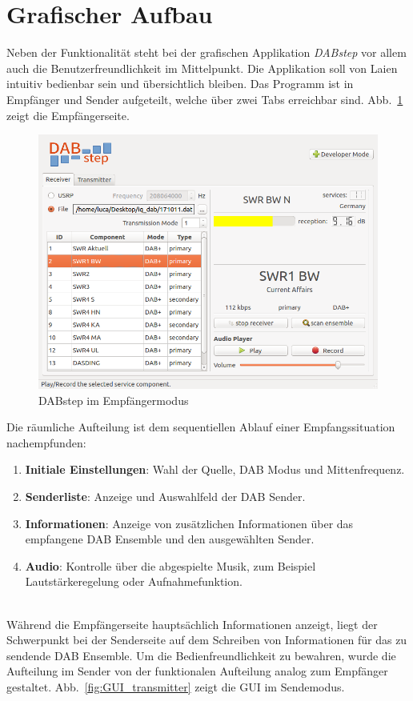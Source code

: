 \section{Grafischer Aufbau}
Neben der Funktionalität steht bei der grafischen Applikation \textit{DABstep} vor allem auch die Benutzerfreundlichkeit im Mittelpunkt. Die Applikation soll von Laien intuitiv bedienbar sein und übersichtlich bleiben. Das Programm ist in Empfänger und Sender aufgeteilt, welche über zwei Tabs erreichbar sind. Abb.~\ref{fig:GUI_receiver} zeigt die Empfängerseite.
\begin{figure}[htb]
\centering
  \includegraphics[width=\textwidth]{figures/GUI_receiver.png}
	\caption{DABstep im Empfängermodus}
	\label{fig:GUI_receiver}
\end{figure}
Die räumliche Aufteilung ist dem sequentiellen Ablauf einer Empfangssituation nachempfunden:
\begin{enumerate}
\item \textbf{Initiale Einstellungen}: Wahl der Quelle, DAB Modus und Mittenfrequenz.
\item \textbf{Senderliste}: Anzeige und Auswahlfeld der DAB Sender.
\item \textbf{Informationen}: Anzeige von zusätzlichen Informationen über das empfangene DAB Ensemble und den ausgewählten Sender.
\item \textbf{Audio}: Kontrolle über die abgespielte Musik, zum Beispiel Lautstärkeregelung oder Aufnahmefunktion.
\end{enumerate}
\\
Während die Empfängerseite hauptsächlich Informationen anzeigt, liegt der Schwerpunkt bei der Senderseite auf dem Schreiben von Informationen für das zu sendende DAB Ensemble. Um die Bedienfreundlichkeit zu bewahren, wurde die Aufteilung im Sender von der funktionalen Aufteilung analog zum Empfänger gestaltet. Abb.~\ref{fig:GUI_transmitter} zeigt die GUI im Sendemodus.
